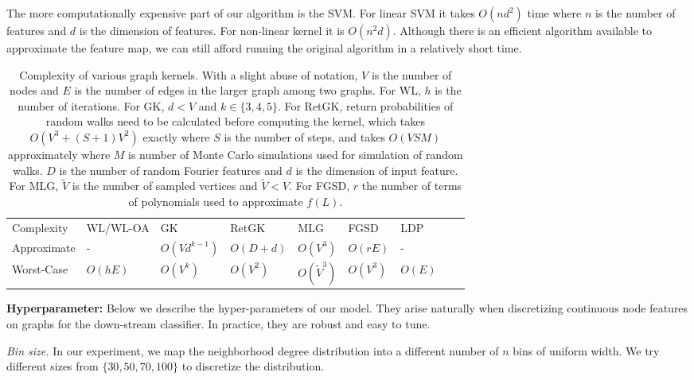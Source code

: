 \documentclass[11pt,onecolumn]{article}
\newcommand{\DOM}       {{LDP}\xspace}
\begin{document}
The more computationally expensive part of our algorithm is the SVM. For linear SVM it takes $O(nd^2)$ time where $n$ is the number of features and $d$ is the dimension of features. For non-linear kernel it is $O(n^2d)$. Although there is an efficient algorithm available to approximate the feature map\cite{rahimi2008random}, we can still afford running the original algorithm in a relatively short time. 
\begin{table}[h]
\label{tab: t1}
\centering
\begin{tabular}{@{}lllllllll@{}}
\toprule
Complexity  
& WL/WL-OA           
& GK                      
& RetGK      
& MLG                       
& FGSD    
& \DOM{} \\
Approximate & -                       & $O(Vd^{k-1}) $             & $O(D + d)$                       & $O(V^3)$                 & $O(rE)$                 & -        \\
Worst-Case  & $O(hE)$            & $O(V^k)$                        &  $O(V^2)$                          &  $O(\tilde{V}^3)$       & $O(V^3)$                  & $O(E)$   \\ \bottomrule
\end{tabular}
\caption{ Complexity of various graph kernels. With a slight abuse of notation, $V$ is the number of nodes and $E$ is the number of edges in the larger graph among two graphs. For WL\cite{shervashidze2011weisfeiler, kriege2016valid}, $h$ is the number of iterations. For GK\cite{shervashidze2009efficient}, $d < V$ and $k\in\{3,4,5\}$.  For RetGK\cite{zhang2018retgk}, return probabilities of random walks need to be calculated before computing the kernel, which takes $O(V^3 + (S + 1)V^2)$ exactly where $S$ is the number of steps, and takes $O(VSM)$ approximately where $M$ is number of Monte Carlo simulations used for simulation of random walks. $D$ is the number of random Fourier features and $d$ is the dimension of input feature. For MLG\cite{kondor2016multiscale}, $\tilde{V}$ is the number of sampled vertices and $\tilde{V} < V.$ For FGSD\cite{verma2017hunt}, $r$ the number of terms of polynomials used to approximate $f(L).$} 
\end{table}

\textbf{Hyperparameter: }
Below we describe the hyper-parameters of our model. They arise naturally when discretizing continuous node features on graphs for the down-stream classifier. In practice, they are robust and easy to tune. 

\emph{Bin size.}  In our experiment, we map the neighborhood degree distribution into a different number of $n$ bins of uniform width. We try different sizes from $\{30, 50, 70, 100\}$ to discretize the distribution.
\end{document}
